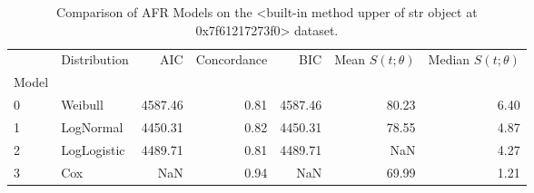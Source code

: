 \begin{table}
\caption{Comparison of AFR Models on the <built-in method upper of str object at 0x7f61217273f0> dataset.}
\label{tab:cifar10}
\begin{tabular}{llrrrrr}
\toprule
 & Distribution & AIC & Concordance & BIC & Mean $S(t;\theta)$ & Median $S(t;\theta)$ \\
Model &  &  &  &  &  &  \\
\midrule
0 & Weibull & 4587.46 & 0.81 & 4587.46 & 80.23 & 6.40 \\
1 & LogNormal & 4450.31 & 0.82 & 4450.31 & 78.55 & 4.87 \\
2 & LogLogistic & 4489.71 & 0.81 & 4489.71 & NaN & 4.27 \\
3 & Cox & NaN & 0.94 & NaN & 69.99 & 1.21 \\
\bottomrule
\end{tabular}
\end{table}
